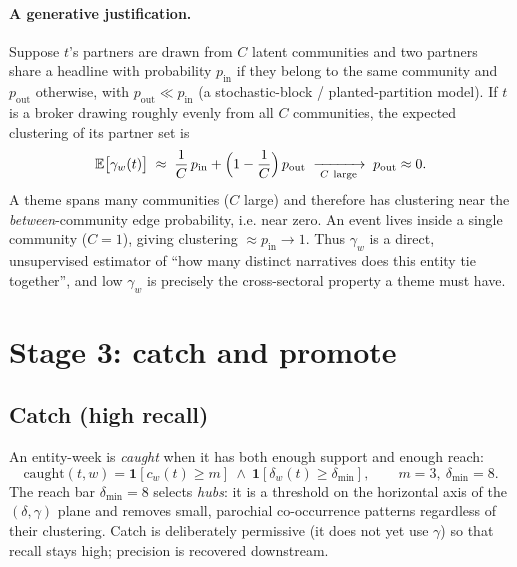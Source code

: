 \documentclass[11pt]{article}
\newcommand{\ind}[1]{\mathbf{1}\!\left[#1\right]}        %
\renewcommand{\deg}{\delta}                               %
\newcommand{\clu}{\gamma}                                 %
\theoremstyle{definition}
\theoremstyle{remark}
\begin{document}
\paragraph{A generative justification.}
Suppose $t$'s partners are drawn from $C$ latent communities and two partners share a headline
with probability $p_{\mathrm{in}}$ if they belong to the same community and $p_{\mathrm{out}}$
otherwise, with $p_{\mathrm{out}}\ll p_{\mathrm{in}}$ (a stochastic-block / planted-partition
model). If $t$ is a broker drawing roughly evenly from all $C$ communities, the expected
clustering of its partner set is
\begin{equation}
\mathbb{E}\bigl[\clu_w(t)\bigr]\;\approx\;
\frac{1}{C}\,p_{\mathrm{in}}+\Bigl(1-\frac{1}{C}\Bigr)\,p_{\mathrm{out}}
\;\xrightarrow[\;C\ \text{large}\;]{}\;p_{\mathrm{out}}\approx 0 .
\end{equation}
A theme spans many communities ($C$ large) and therefore has clustering near the
\emph{between}-community edge probability, i.e. near zero. An event lives inside a single
community ($C=1$), giving clustering $\approx p_{\mathrm{in}}\to 1$. Thus $\clu_w$ is a direct,
unsupervised estimator of ``how many distinct narratives does this entity tie together'',
and low $\clu_w$ is precisely the cross-sectoral property a theme must have.

\section{Stage 3: catch and promote}\label{sec:stage3}

\subsection{Catch (high recall)}
An entity-week is \emph{caught} when it has both enough support and enough reach:
\begin{equation}
\mathrm{caught}(t,w)=\ind{c_w(t)\ge m}\ \wedge\ \ind{\deg_w(t)\ge \deg_{\min}},
\qquad m=3,\ \deg_{\min}=8.
\end{equation}
The reach bar $\deg_{\min}=8$ selects \emph{hubs}: it is a threshold on the horizontal axis of
the $(\deg,\clu)$ plane and removes small, parochial co-occurrence patterns regardless of their
clustering. Catch is deliberately permissive (it does not yet use $\clu$) so that recall stays
high; precision is recovered downstream.
\end{document}
